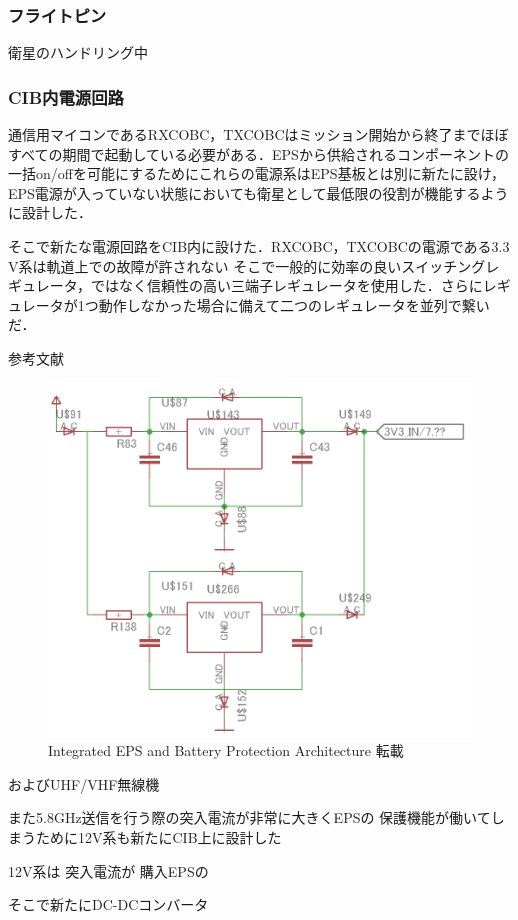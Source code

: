 \subsubsection{フライトピン}
衛星のハンドリング中




\subsubsection{CIB内電源回路}
通信用マイコンであるRXCOBC，TXCOBCはミッション開始から終了までほぼすべての期間で起動している必要がある．EPSから供給されるコンポーネントの一括on/offを可能にするためにこれらの電源系はEPS基板とは別に新たに設け，EPS電源が入っていない状態においても衛星として最低限の役割が機能するように設計した．




そこで新たな電源回路をCIB内に設けた．RXCOBC，TXCOBCの電源である3.3 V系は軌道上での故障が許されない
そこで一般的に効率の良いスイッチングレギュレータ，ではなく信頼性の高い三端子レギュレータを使用した．さらにレギュレータが1つ動作しなかった場合に備えて二つのレギュレータを並列で繋いだ．

参考文献


\begin{figure}[htbp]
	\begin{center}
		\includegraphics[width=0.6\linewidth]{./03/fig/3V3.png}
		\caption{Integrated EPS and Battery Protection Architecture 転載}
		\label{fig3_1_inhibit_d}
	\end{center}
\end{figure}

およびUHF/VHF無線機


また5.8GHz送信を行う際の突入電流が非常に大きくEPSの
保護機能が働いてしまうために12V系も新たにCIB上に設計した


12V系は
突入電流が
購入EPSの

そこで新たにDC-DCコンバータ

